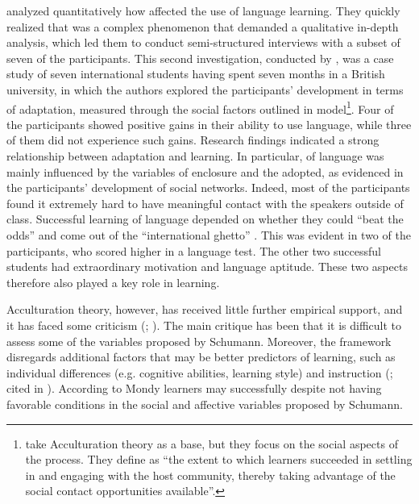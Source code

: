 \documentclass[output=paper]{langsci/langscibook}
\begin{document}
\citet{SchmittEtAl2004} analyzed quantitatively how  affected the use of  language learning. They quickly realized that  was a complex phenomenon that demanded a qualitative in-depth analysis, which led them to conduct semi-structured interviews with a subset of seven of the participants. This second investigation, conducted by \citet{DörnyeiEtAl2004}, was a case study of seven international students having spent seven months in a British university, in which the authors explored the participants’  development in terms of  adaptation, measured through the social factors outlined in  model\footnote{\citet[88]{DörnyeiEtAl2004} take  Acculturation theory as a base, but they focus on the social aspects of the process. They define  as “the extent to which learners succeeded in settling in and engaging with the host community, thereby taking advantage of the social contact opportunities available”.}. Four of the participants showed positive gains in their ability to use  language, while three of them did not experience such gains. Research findings indicated a strong relationship between  adaptation and  learning. In particular,  of  language was mainly influenced by the variables of enclosure and the  adopted, as evidenced in the participants’ development of social networks. Indeed, most of the participants found it extremely hard to have meaningful contact with the  speakers outside of class. Successful learning of  language depended on whether they could “beat the odds” and come out of the “international ghetto” \citep[105]{DörnyeiEtAl2004}. This was evident in two of the participants, who scored higher in a  language test. The other two successful students had extraordinary motivation and language aptitude. These two aspects therefore also played a key role in  learning. 

\largerpage
{} Acculturation theory, however, has received little further empirical support, and it has faced some criticism (\citealt{Ellis1994}; \citealt{Zaker2016}). The main critique has been that it is difficult to assess some of the variables proposed by Schumann. Moreover, the framework disregards additional factors that may be better predictors of  learning, such as individual differences (e.g. cognitive abilities, learning style) and instruction (\citealt{Mondy2007}; cited in \citealt{Zaker2016}). According to Mondy \citeyear{Mondy2007} learners may  successfully despite not having favorable conditions in the social and affective variables proposed by Schumann. 
\end{document}
